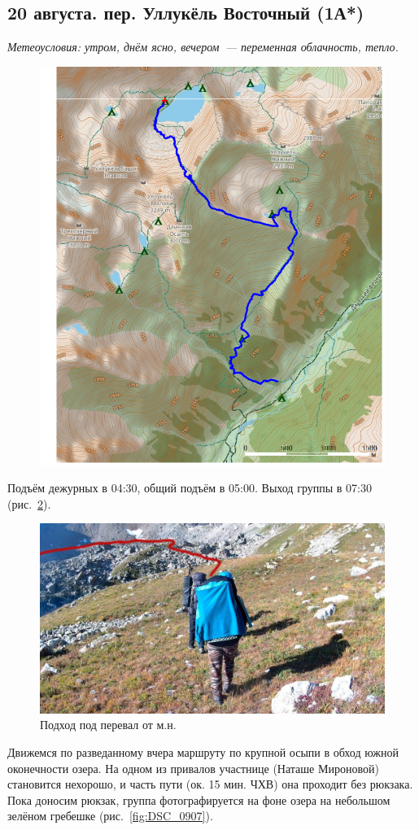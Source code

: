 \subsection{20 августа. пер. Уллукёль Восточный (1А*)}
\textit{Метеоусловия: утром, днём ясно, вечером~--- переменная облачность, тепло.}

\begin{figure}[h!]
	\centering
	\includegraphics[angle=0, width=0.7\linewidth]{../pics/mini_maps/20}
	\label{fig:mini_20}
\end{figure}

Подъём дежурных в 04:30, общий подъём в 05:00. Выход группы в 07:30 (рис.~\ref{fig:20aug1.jpg}).

\begin{figure}[h!]
	\centering
	\includegraphics[width=0.7\linewidth]{../pics/20aug1.jpg}
	\caption{Подход под перевал от м.н.}
	\label{fig:20aug1.jpg}
\end{figure}


 Движемся по разведанному вчера маршруту по крупной осыпи в обход южной оконечности озера. На одном из привалов участнице (Наташе Мироновой) становится нехорошо, и часть пути (ок. 15 мин. ЧХВ) она проходит без рюкзака. Пока доносим рюкзак, группа фотографируется на фоне озера на небольшом зелёном гребешке (рис.~\ref{fig:DSC_0907}).
 
